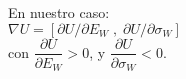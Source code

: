 \documentclass{beamer}
\begin{document}
\begin{frame}[t,fragile]
	\frametitle{\subsecname}
	\begin{columns}[t]
		\vfill
		\begin{block}{\centering }
		En nuestro caso:
		\[
			\nabla U = [\partial U / \partial E_W \;,\; \partial U/\partial \sigma _W] 
		\]
		con \(\dfrac{\partial U}{\partial E_W} >0\), y 
		\(\dfrac{\partial U}{\partial \sigma _W} < 0\).
		\end{block}
	\end{columns}
\end{frame}
\end{document}
